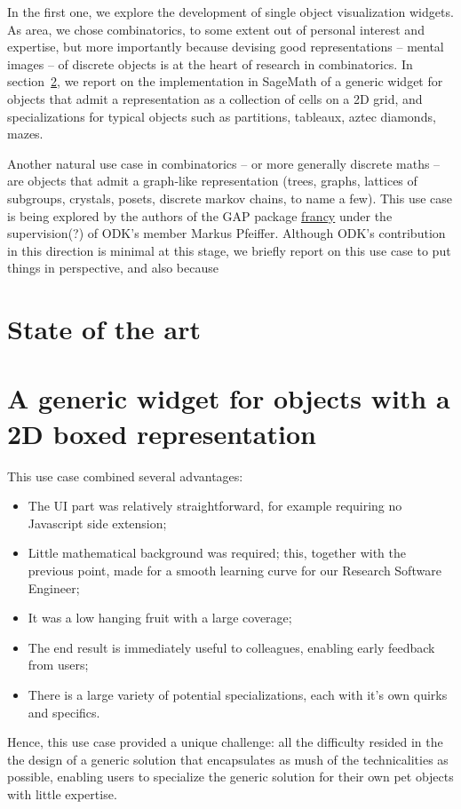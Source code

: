 \documentclass{deliverablereport}
\begin{document}
In the first one, we explore the development of single object
visualization widgets. As area, we chose combinatorics, to some extent
out of personal interest and expertise, but more importantly because
devising good representations -- mental images -- of discrete objects
is at the heart of research in combinatorics. In section~\ref{grid},
we report on the implementation in SageMath of a generic widget for
objects that admit a representation as a collection of cells on a 2D
grid, and specializations for typical objects such as partitions,
tableaux, aztec diamonds, mazes.






Another natural use case in combinatorics -- or more generally
discrete maths -- are objects that admit a graph-like representation
(trees, graphs, lattices of subgroups, crystals, posets, discrete
markov chains, to name a few). This use case is being explored by the
authors of the GAP package
\href{https://github.com/mcmartins/francy}{francy} under the
supervision(?) of ODK's member Markus Pfeiffer. Although ODK's
contribution in this direction is minimal at this stage, we briefly
report on this use case to put things in perspective, and also because


\section{State of the art}



\section{A generic widget for objects with a 2D boxed representation}
\label{grid}

This use case combined several advantages:
\begin{itemize}
\item The UI part was relatively straightforward, for example
  requiring no Javascript side extension;
\item Little mathematical background was required; this, together with
  the previous point, made for a smooth learning curve for our
  Research Software Engineer;
\item It was a low hanging fruit with a large coverage;
\item The end result is immediately useful to colleagues, enabling
  early feedback from users;
\item There is a large variety of potential specializations, each with
  it's own quirks and specifics.
\end{itemize}
Hence, this use case provided a unique challenge: all the difficulty
resided in the the design of a generic solution that encapsulates as
mush of the technicalities as possible, enabling users to specialize
the generic solution for their own pet objects with little expertise.
\end{document}
